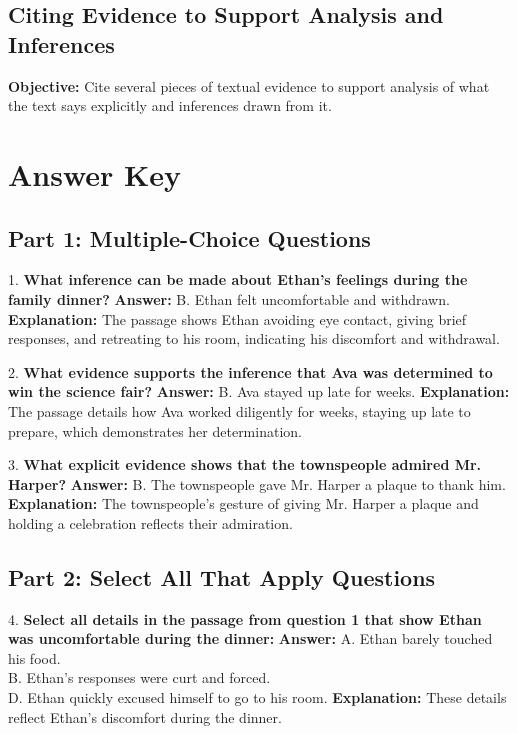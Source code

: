 \documentclass[12pt]{article}
\begin{document}
\subsection*{Citing Evidence to Support Analysis and Inferences}
\onehalfspacing

\begin{tcolorbox}[colframe=black!40, colback=gray!0, title=Learning Objective]
\textbf{Objective:} Cite several pieces of textual evidence to support analysis of what the text says explicitly and inferences drawn from it.
\end{tcolorbox}


\section*{Answer Key}

\subsection*{Part 1: Multiple-Choice Questions}

1. \textbf{What inference can be made about Ethan's feelings during the family dinner?}  
\textbf{Answer:} B. Ethan felt uncomfortable and withdrawn.  
\textbf{Explanation:} The passage shows Ethan avoiding eye contact, giving brief responses, and retreating to his room, indicating his discomfort and withdrawal.

\vspace{1cm}
2. \textbf{What evidence supports the inference that Ava was determined to win the science fair?}  
\textbf{Answer:} B. Ava stayed up late for weeks.  
\textbf{Explanation:} The passage details how Ava worked diligently for weeks, staying up late to prepare, which demonstrates her determination.

\vspace{1cm}
3. \textbf{What explicit evidence shows that the townspeople admired Mr. Harper?}  
\textbf{Answer:} B. The townspeople gave Mr. Harper a plaque to thank him.  
\textbf{Explanation:} The townspeople's gesture of giving Mr. Harper a plaque and holding a celebration reflects their admiration.

\subsection*{Part 2: Select All That Apply Questions}

4. \textbf{Select all details in the passage from question 1 that show Ethan was uncomfortable during the dinner:}  
\textbf{Answer:} A. Ethan barely touched his food. \\
B. Ethan’s responses were curt and forced. \\
D. Ethan quickly excused himself to go to his room.  
\textbf{Explanation:} These details reflect Ethan's discomfort during the dinner.
\end{document}
